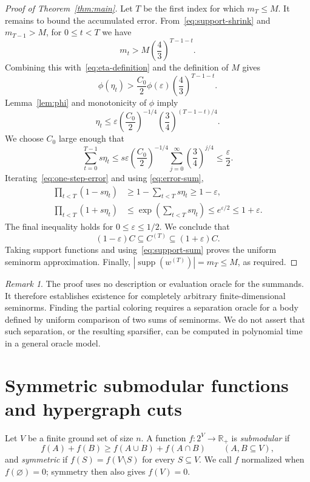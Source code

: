\documentclass[11pt]{article}
\theoremstyle{remark}
\newtheorem{remark}[theorem]{Remark}
\newcommand{\R}{\mathbb{R}}
\newcommand{\supp}{\operatorname{supp}}
\newcommand{\eps}{\varepsilon}
\begin{document}
\begin{proof}[Proof of Theorem~\ref{thm:main}]
Let $T$ be the first index for which $m_T\leq M$.  It remains to bound
the accumulated error.  From~\eqref{eq:support-shrink} and
$m_{T-1}>M$, for $0\leq t<T$ we have
\[
  m_t>M\left(\frac43\right)^{T-1-t}.
\]
Combining this with~\eqref{eq:eta-definition} and the definition of
$M$ gives
\[
  \phi(\eta_t)>
  \frac{C_0}{2}\phi(\eps)
  \left(\frac43\right)^{T-1-t}.
\]
Lemma~\ref{lem:phi} and monotonicity of $\phi$ imply
\[
  \eta_t\leq
  \eps\left(\frac{C_0}{2}\right)^{-1/4}
  \left(\frac34\right)^{(T-1-t)/4}.
\]
We choose $C_0$ large enough that
\begin{equation}\label{eq:error-sum}
  \sum_{t=0}^{T-1}s\eta_t
  \leq
  s\eps\left(\frac{C_0}{2}\right)^{-1/4}
  \sum_{j=0}^{\infty}\left(\frac34\right)^{j/4}
  \leq\frac\eps2.
\end{equation}
Iterating~\eqref{eq:one-step-error} and using
\eqref{eq:error-sum},
\begin{align*}
  \prod_{t<T}(1-s\eta_t)
  &\geq1-\sum_{t<T}s\eta_t\geq1-\eps,\\
  \prod_{t<T}(1+s\eta_t)
  &\leq\exp\left(\sum_{t<T}s\eta_t\right)
    \leq e^{\eps/2}\leq1+\eps.
\end{align*}
The final inequality holds for $0\leq\eps\leq1/2$.  We conclude that
\[
  (1-\eps)C\subseteq C^{(T)}\subseteq(1+\eps)C.
\]
Taking support functions and using~\eqref{eq:support-sum} proves the
uniform seminorm approximation.  Finally,
$|\supp(w^{(T)})|=m_T\leq M$, as required.
\end{proof}

\begin{remark}
The proof uses no description or evaluation oracle for the summands.
It therefore establishes existence for completely arbitrary
finite-dimensional seminorms.  Finding the partial coloring requires
a separation oracle for a body defined by uniform comparison of two
sums of seminorms.  We do not assert that such separation, or the
resulting sparsifier, can be computed in polynomial time in a general
oracle model.
\end{remark}

\section{Symmetric submodular functions and hypergraph cuts}
\label{sec:applications}

Let $V$ be a finite ground set of size $n$.  A function
$f:2^V\to\R_+$ is \emph{submodular} if
\[
  f(A)+f(B)\geq f(A\cup B)+f(A\cap B)
  \qquad(A,B\subseteq V),
\]
and \emph{symmetric} if $f(S)=f(V\setminus S)$ for every $S\subseteq
V$.  We call $f$ normalized when $f(\varnothing)=0$; symmetry then
also gives $f(V)=0$.
\end{document}
